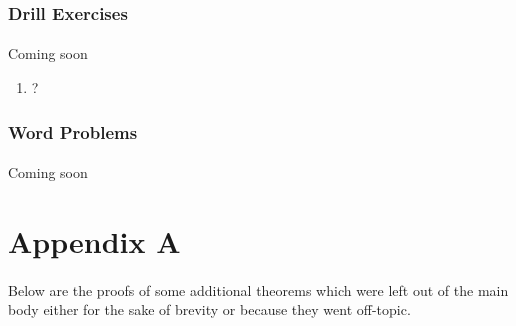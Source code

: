 \documentclass[12pt, a4paper, titlepage, twoside]{article}
\begin{document}
	\subsubsection*{Drill Exercises}
	
	\paragraph{}
	 Coming soon
	
	\begin{multicols}{2}
		\begin{enumerate}[label=\textbf{(\alph*)}]
			\item ?
		\end{enumerate}
	\end{multicols}
	
	\hfill
	
	\subsubsection*{Word Problems}
	
	\paragraph{}
	 Coming soon 
	
	
	\newpage 
	
	
\section{Appendix A}

	\paragraph{}
	Below are the proofs of some additional theorems which were left out of the main body either for the sake of brevity or because they
	went off-topic.\\
\end{document}
